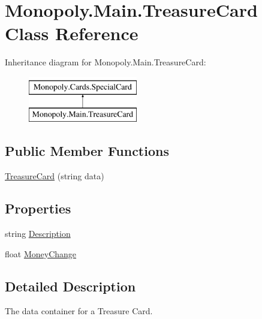\hypertarget{class_monopoly_1_1_main_1_1_treasure_card}{}\section{Monopoly.\+Main.\+Treasure\+Card Class Reference}
\label{class_monopoly_1_1_main_1_1_treasure_card}
Inheritance diagram for Monopoly.\+Main.\+Treasure\+Card\+:\begin{figure}[H]
\begin{center}
\leavevmode
\includegraphics[height=2.000000cm]{class_monopoly_1_1_main_1_1_treasure_card}
\end{center}
\end{figure}
\subsection*{Public Member Functions}
\begin{DoxyCompactItemize}
\item 
\mbox{\hyperlink{class_monopoly_1_1_main_1_1_treasure_card_a4a70f432c589c3a93986f897dc4db8cc}{Treasure\+Card}} (string data)
\end{DoxyCompactItemize}
\subsection*{Properties}
\begin{DoxyCompactItemize}
\item 
string \mbox{\hyperlink{class_monopoly_1_1_cards_1_1_special_card_a7404d6bf23aa3858a8831075162bcb66}{Description}}
\item 
float \mbox{\hyperlink{class_monopoly_1_1_cards_1_1_special_card_ab81aa9650e34745aa35b313730a8c0c4}{Money\+Change}}
\end{DoxyCompactItemize}


\subsection{Detailed Description}
The data container for a Treasure Card. 

